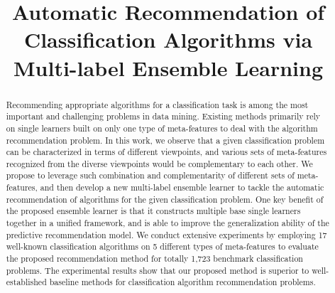 \documentclass[prodmode,acmtkdd]{acmsmall}
\begin{document}


\title{Automatic Recommendation of Classification Algorithms via Multi-label Ensemble Learning}

\begin{abstract}
Recommending appropriate algorithms for a classification task is among
the most important and challenging problems in data mining.
Existing methods primarily rely on single learners built on only one type of meta-features to deal with the algorithm recommendation problem.
In this work,
we observe that a given classification problem can be characterized in terms of different viewpoints,
and various sets of meta-features recognized from the diverse viewpoints would be complementary to each other.
We propose to leverage such combination and complementarity of different sets of meta-features,
and then develop a new multi-label ensemble learner to tackle the automatic recommendation of algorithms for the given classification problem.
One key benefit of the proposed ensemble learner is that
it constructs multiple base single learners together in a unified framework,
and is able to improve the generalization ability of the predictive recommendation model.
We conduct extensive experiments by employing 17 well-known classification algorithms on 5 different types of meta-features
to evaluate the proposed recommendation method for totally 1,723 benchmark classification problems.
The experimental results show that our proposed method is superior to
well-established baseline methods for classification algorithm recommendation problems.
\end{abstract}








%
\end{document}
